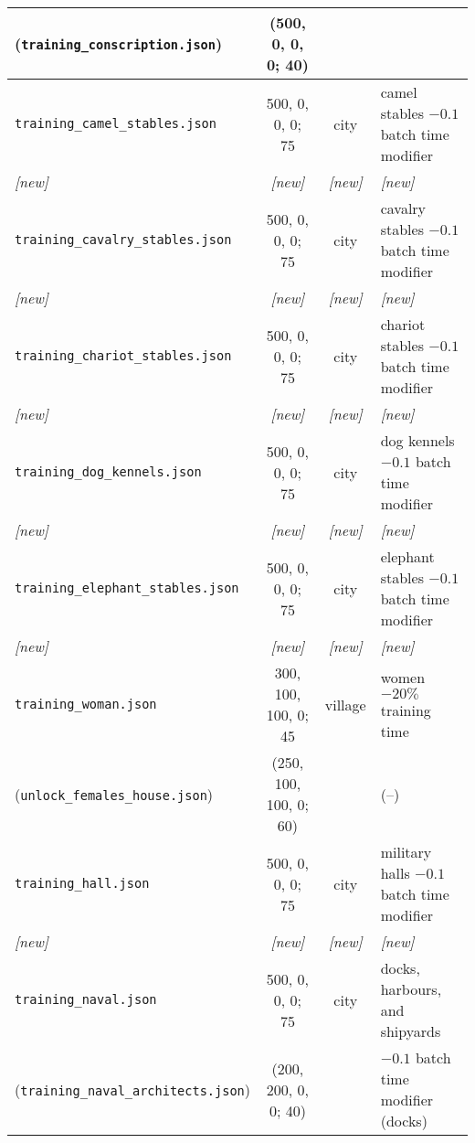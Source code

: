 \documentclass{article}
\begin{document}
\begin{tabular}{l|cc|l}
(\verb+training_conscription.json+)          &  (500,    0,    0,    0;  40) &            & \\
\hline
\verb+training_camel_stables.json+           &   500,    0,    0,    0;  75  & city       & camel stables $-0.1$ batch time modifier \\ %
\emph{[new]} & \emph{[new]} & \emph{[new]}   & \emph{[new]} \\
\hline
\verb+training_cavalry_stables.json+         &   500,    0,    0,    0;  75  & city       & cavalry stables $-0.1$ batch time modifier \\ %
\emph{[new]} & \emph{[new]} & \emph{[new]}   & \emph{[new]} \\
\hline
\verb+training_chariot_stables.json+         &   500,    0,    0,    0;  75  & city       & chariot stables $-0.1$ batch time modifier \\ %
\emph{[new]} & \emph{[new]} & \emph{[new]}   & \emph{[new]} \\
\hline
\verb+training_dog_kennels.json+             &   500,    0,    0,    0;  75  & city       & dog kennels $-0.1$ batch time modifier \\ %
\emph{[new]} & \emph{[new]} & \emph{[new]}   & \emph{[new]} \\
\hline
\verb+training_elephant_stables.json+        &   500,    0,    0,    0;  75  & city       & elephant stables $-0.1$ batch time modifier \\ %
\emph{[new]} & \emph{[new]} & \emph{[new]}   & \emph{[new]} \\
\hline
\verb+training_woman.json+                  &   300,  100,  100,    0;  45  & village    & women $-20\%$ training time \\
(\verb+unlock_females_house.json+)           &  (250,  100,  100,    0;  60) &            & (--) \\
\hline
\verb+training_hall.json+                    &   500,    0,    0,    0;  75  & city       & military halls $-0.1$ batch time modifier \\ %
\emph{[new]} & \emph{[new]} & \emph{[new]}   & \emph{[new]} \\
\hline
\verb+training_naval.json+                   &   500,    0,    0,    0;  75  & city       & docks, harbours, and shipyards \\ %
(\verb+training_naval_architects.json+)      &  (200,  200,    0,    0;  40) &            & $-0.1$ batch time modifier (docks) \\
\end{tabular}
\end{document}

